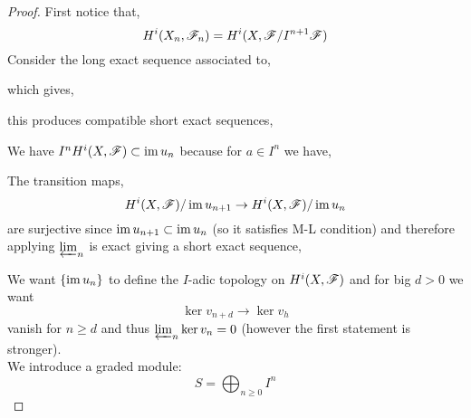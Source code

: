 \documentclass[12pt]{article}
\begin{document}
\begin{proof}
First notice that,
\[ H^i(X_n, \mathscr{F}_n) = H^i(X, \mathscr{F} / I^{n+1} \mathscr{F}) \]
Consider the long exact sequence associated to,
\begin{center}
\end{center}
which gives,
\begin{center}
\end{center}
this produces compatible short exact sequences,
\begin{center}
\end{center}
We have $I^n H^i(X, \mathscr{F}) \subset \operatorname{\mathrm{im}}{u_n}$ because for $a \in I^n$ we have,
\begin{center}
\end{center}
The transition maps,
\[ H^i(X, \mathscr{F}) / \operatorname{\mathrm{im}}{u_{n+1}} \to H^i(X, \mathscr{F}) / \operatorname{\mathrm{im}}{u_n} \]
are surjective since $\operatorname{\mathrm{im}}{u_{n+1}} \subset \operatorname{\mathrm{im}}{u_n}$ (so it satisfies M-L condition) and therefore applying $\varprojlim_n$ is exact giving a short exact sequence,
\begin{center}
\end{center} 
We want $\{ \operatorname{\mathrm{im}}{u_n} \}$ to define the $I$-adic topology on $H^i(X, \mathscr{F})$ and for big $d > 0$ we want
\[ \ker{v_{n+d}} \to \ker{v_h} \] vanish for $n \ge d$ and thus $\varprojlim_n \ker{v_n} = 0$ (however the first statement is stronger). 
\bigskip\\
We introduce a graded module:
\[ S = \bigoplus_{n \ge 0} I^n \]

\end{proof}
\end{document}
